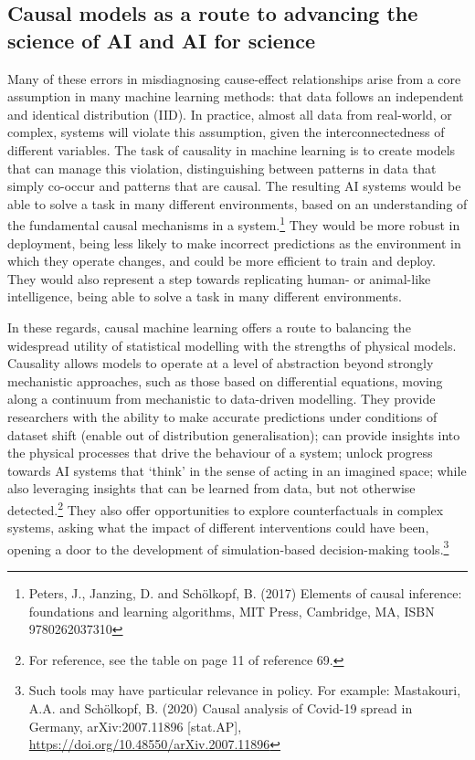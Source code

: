 \subsection{Causal models as a route to advancing the science of AI and
AI for
science}\label{causal-models-as-a-route-to-advancing-the-science-of-ai-and-ai-for-science}

Many of these errors in misdiagnosing cause-effect relationships arise
from a core assumption in many machine learning methods: that data
follows an independent and identical distribution (IID). In practice,
almost all data from real-world, or complex, systems will violate this
assumption, given the interconnectedness of different variables. The
task of causality in machine learning is to create models that can
manage this violation, distinguishing between patterns in data that
simply co-occur and patterns that are causal. The resulting AI systems
would be able to solve a task in many different environments, based on
an understanding of the fundamental causal mechanisms in a
system.\footnote{Peters, J., Janzing, D. and Schölkopf, B. (2017)
  Elements of causal inference: foundations and learning algorithms, MIT
  Press, Cambridge, MA, ISBN 9780262037310} They would be more robust in
deployment, being less likely to make incorrect predictions as the
environment in which they operate changes, and could be more efficient
to train and deploy. They would also represent a step towards
replicating human- or animal-like intelligence, being able to solve a
task in many different environments.

In these regards, causal machine learning offers a route to balancing
the widespread utility of statistical modelling with the strengths of
physical models. Causality allows models to operate at a level of
abstraction beyond strongly mechanistic approaches, such as those based
on differential equations, moving along a continuum from mechanistic to
data-driven modelling. They provide researchers with the ability to make
accurate predictions under conditions of dataset shift (enable out of
distribution generalisation); can provide insights into the physical
processes that drive the behaviour of a system; unlock progress towards
AI systems that `think' in the sense of acting in an imagined space;
while also leveraging insights that can be learned from data, but not
otherwise detected.\footnote{For reference, see the table on page 11 of
  reference 69.} They also offer opportunities to explore
counterfactuals in complex systems, asking what the impact of different
interventions could have been, opening a door to the development of
simulation-based decision-making tools.\footnote{Such tools may have
  particular relevance in policy. For example: Mastakouri, A.A. and
  Schölkopf, B. (2020) Causal analysis of Covid-19 spread in Germany,
  arXiv:2007.11896 {[}stat.AP{]},
  \url{https://doi.org/10.48550/arXiv.2007.11896}}

